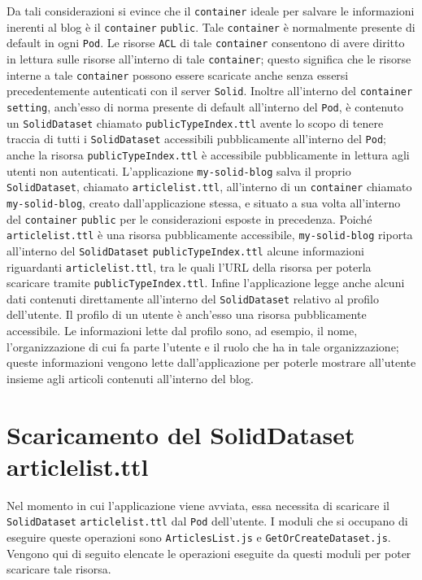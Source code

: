 Da tali considerazioni si evince che il {\tt container} ideale per salvare le informazioni inerenti al blog è il {\tt container} {\tt public}. Tale {\tt container} è normalmente presente di default in ogni {\tt Pod}. Le risorse {\tt ACL} di tale {\tt container} consentono di avere diritto in lettura sulle risorse all'interno di tale {\tt container}; questo significa che le risorse interne a tale {\tt container} possono essere scaricate anche senza essersi precedentemente autenticati con il server {\tt Solid}. Inoltre all'interno del {\tt container} {\tt setting}, anch'esso di norma presente di default all'interno del {\tt Pod}, è contenuto un {\tt SolidDataset} chiamato {\tt publicTypeIndex.ttl} avente lo scopo di tenere traccia di tutti i {\tt SolidDataset} accessibili pubblicamente all'interno del {\tt Pod}; anche la risorsa {\tt publicTypeIndex.ttl} è accessibile pubblicamente in lettura agli utenti non autenticati. L'applicazione {\tt my-solid-blog} salva il proprio {\tt SolidDataset}, chiamato {\tt articlelist.ttl}, all'interno di un {\tt container} chiamato\\ {\tt my-solid-blog}, creato dall'applicazione stessa, e situato a sua volta all'interno del {\tt container} {\tt public} per le considerazioni esposte in precedenza. Poiché {\tt articlelist.ttl} è una risorsa pubblicamente accessibile, {\tt my-solid-blog} riporta all'interno del {\tt SolidDataset} {\tt publicTypeIndex.ttl} alcune informazioni riguardanti {\tt articlelist.ttl}, tra le quali l'URL della risorsa per poterla scaricare tramite {\tt publicTypeIndex.ttl}. Infine l'applicazione legge anche alcuni dati contenuti direttamente all'interno del {\tt SolidDataset} relativo al profilo dell'utente. Il profilo di un utente è anch'esso una risorsa pubblicamente accessibile. Le informazioni lette dal profilo sono, ad esempio, il nome, l'organizzazione di cui fa parte l'utente e il ruolo che ha in tale organizzazione; queste informazioni vengono lette dall'applicazione per poterle mostrare all'utente insieme agli articoli contenuti all'interno del blog.

\bigskip

\section{Scaricamento del SolidDataset articlelist.ttl}

\medskip 

Nel momento in cui l'applicazione viene avviata, essa necessita di scaricare il {\tt SolidDataset} {\tt articlelist.ttl} dal {\tt Pod} dell'utente. I moduli che si occupano di eseguire queste operazioni sono {\tt ArticlesList.js} e {\tt GetOrCreateDataset.js}. Vengono qui di seguito elencate le operazioni eseguite da questi moduli per poter scaricare tale risorsa.

